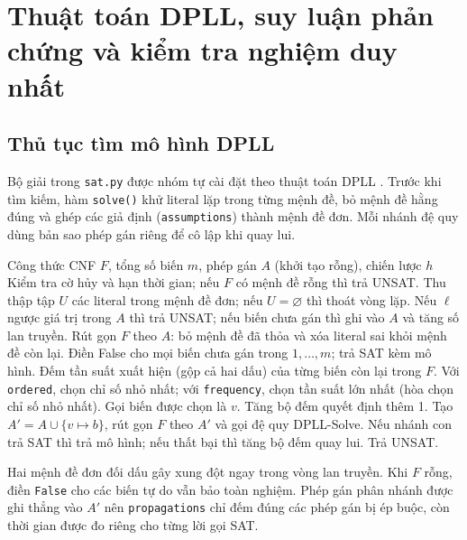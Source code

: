 \section{Thuật toán DPLL, suy luận phản chứng và kiểm tra nghiệm duy nhất}

\subsection{Thủ tục tìm mô hình DPLL}

Bộ giải trong \texttt{sat.py} được nhóm tự cài đặt theo thuật toán DPLL \cite{davis1962machine}. Trước khi tìm kiếm, hàm \texttt{solve()} khử literal lặp trong từng mệnh đề, bỏ mệnh đề hằng đúng và ghép các giả định (\texttt{assumptions}) thành mệnh đề đơn. Mỗi nhánh đệ quy dùng bản sao phép gán riêng để cô lập khi quay lui.

\begin{algorithm}[H]
\small\singlespacing
\caption{DPLL-Solve với hai chiến lược chọn biến}
\begin{algorithmic}[1]
\Require Công thức CNF $F$, tổng số biến $m$, phép gán $A$ (khởi tạo rỗng), chiến lược $h$
\Loop
\State Kiểm tra cờ hủy và hạn thời gian; nếu $F$ có mệnh đề rỗng thì trả UNSAT.
\State Thu thập tập $U$ các literal trong mệnh đề đơn; nếu $U=\varnothing$ thì thoát vòng lặp.
\State Nếu $\ell$ ngược giá trị trong $A$ thì trả UNSAT; nếu biến chưa gán thì ghi vào $A$ và tăng số lan truyền.
\EndFor
\State Rút gọn $F$ theo $A$: bỏ mệnh đề đã thỏa và xóa literal sai khỏi mệnh đề còn lại.
\EndLoop
{}
\State Điền False cho mọi biến chưa gán trong $1,\ldots,m$; trả SAT kèm mô hình.
\EndIf
\State Đếm tần suất xuất hiện (gộp cả hai dấu) của từng biến còn lại trong $F$.
\State Với \texttt{ordered}, chọn chỉ số nhỏ nhất; với \texttt{frequency}, chọn tần suất lớn nhất (hòa chọn chỉ số nhỏ nhất). Gọi biến được chọn là $v$.
\State Tăng bộ đếm quyết định thêm 1.
\State Tạo $A' = A \cup \{v \mapsto b\}$, rút gọn $F$ theo $A'$ và gọi đệ quy DPLL-Solve.
\State Nếu nhánh con trả SAT thì trả mô hình; nếu thất bại thì tăng bộ đếm quay lui.
\EndFor
\State Trả UNSAT.
\end{algorithmic}
\end{algorithm}

Hai mệnh đề đơn đối dấu gây xung đột ngay trong vòng lan truyền. Khi $F$ rỗng, điền \texttt{False} cho các biến tự do vẫn bảo toàn nghiệm. Phép gán phân nhánh được ghi thẳng vào $A'$ nên \texttt{propagations} chỉ đếm đúng các phép gán bị ép buộc, còn thời gian được đo riêng cho từng lời gọi SAT.

